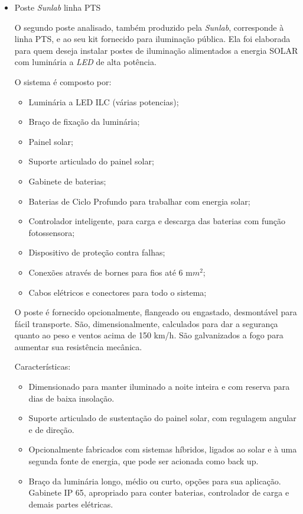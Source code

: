 \begin{itemize}
	\item Poste \textit{Sunlab} linha PTS
	
	O segundo poste analisado, também  produzido pela \textit{Sunlab}, corresponde à linha PTS, e ao seu kit fornecido para iluminação pública. Ela foi elaborada para quem deseja instalar postes de iluminação alimentados a energia SOLAR com luminária a \textit{LED} de alta potência.
	
	O sistema é composto por:
	\begin{itemize}
	\item Luminária a LED ILC (várias potencias);
	\item Braço de fixação da luminária;
	\item Painel solar;
	\item Suporte articulado do painel solar;
 	\item Gabinete de baterias; 
 	\item Baterias de Ciclo Profundo para trabalhar com energia solar;
	\item Controlador inteligente, para carga e descarga das baterias com função fotossensora;
 	\item Dispositivo de proteção contra falhas;
	\item Conexões através de bornes para fios até 6 m$m^{2}$;
	\item Cabos elétricos e conectores para todo o sistema;
	\end{itemize}
	
	O poste é fornecido opcionalmente, flangeado ou engastado, desmontável para fácil transporte. São, dimensionalmente, calculados para dar a segurança quanto ao peso e ventos acima de 150 km/h. São galvanizados a fogo para aumentar sua resistência mecânica.
	
	Características:
	
	\begin{itemize}
	\item Dimensionado para manter iluminado a noite inteira e com reserva para dias de baixa insolação.
	\item Suporte articulado de sustentação do painel solar, com regulagem angular e de direção. 
 	\item Opcionalmente fabricados com sistemas híbridos, ligados ao solar e à uma segunda fonte de energia, que pode ser acionada como back up. 
	\item Braço da luminária longo, médio ou curto, opções para sua aplicação.
Gabinete IP 65, apropriado para conter baterias, controlador de carga e demais partes elétricas.
	\end{itemize}


\end{itemize}

